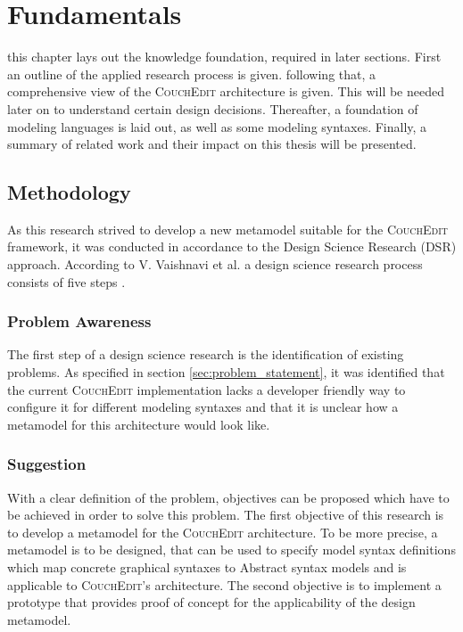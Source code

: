 \chapter{Fundamentals}
\label{chap:fundamentals}

this chapter lays out the knowledge foundation, required in later sections. First an outline of the applied research process is given. following that, a comprehensive view of the \textsc{CouchEdit} architecture is given. This will be needed later on to understand certain design decisions. Thereafter, a foundation of modeling languages is laid out, as well as some modeling syntaxes. Finally, a summary of related work and their impact on this thesis will be presented. 

\section{Methodology}
As this research strived to develop a new metamodel suitable for the \textsc{CouchEdit} framework, it was conducted in accordance to the Design Science Research (DSR) approach. According to V. Vaishnavi et al. a design science research process consists of five steps \cite{vaishnavi_design_2004}.

\subsection{Problem Awareness}
The first step of a design science research is the identification of existing problems. As specified in section \ref{sec:problem_statement}, it was identified that the current \textsc{CouchEdit} implementation lacks a developer friendly way to configure it for different modeling syntaxes and that it is unclear how a metamodel for this architecture would look like.

\subsection{Suggestion}
With a clear definition of the problem, objectives can be proposed which have to be achieved in order to solve this problem. The first objective of this research is to develop a metamodel for the \textsc{CouchEdit} architecture. To be more precise, a metamodel is to be designed, that can be used to specify model syntax definitions which map concrete graphical syntaxes to Abstract syntax models and is applicable to \textsc{CouchEdit}'s architecture. The second objective is to implement a prototype that provides proof of concept for the applicability of the design metamodel.


